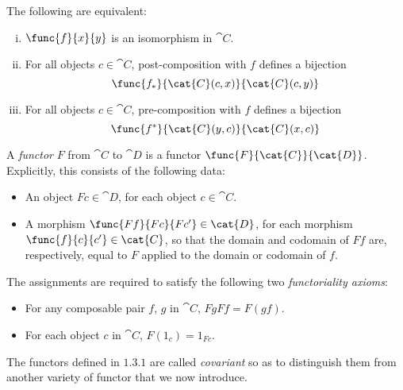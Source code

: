 \documentclass[main.tex]{subfiles}
\begin{document}
\begin{lemma}
	The following are equivalent:
	\begin{enumerate}[(i)]
		\item $\func{f}{x}{y}$ is an isomorphism in $\cat{C}$.

		\item For all objects $c\in\cat{C}$, post-composition with $f$ defines a
			bijection \[\func{f_*}{\cat{C}(c,x)}{\cat{C}(c,y)}\]

		\item For all objects $c\in\cat{C}$, pre-composition with $f$ defines a
			bijection \[\func{f^*}{\cat{C}(y,c)}{\cat{C}(x,c)}\]
	\end{enumerate}
\end{lemma}

\begin{definition}
	A \emph{functor} $F$ from $\cat{C}$ to $\cat{D}$ is a functor
	$\func{F}{\cat{C}}{\cat{D}}$. Explicitly, this consists of the following
	data:
	\begin{itemize}
		\item An object $Fc\in \cat{D}$, for each object $c\in \cat{C}$.

		\item A morphism $\func{Ff}{Fc}{Fc'}\in \cat{D}$, for each morphism
			$\func{f}{c}{c'}\in \cat{C}$, so that the domain and codomain of
			$Ff$ are, respectively, equal to $F$ applied to the domain or
			codomain of $f$.
	\end{itemize}
	The assignments are required to satisfy the following two
	\emph{functoriality axioms}:
	\begin{itemize}
		\item For any composable pair $f$, $g$ in $\cat{C}$, $Fg Ff =
			F(g f)$.

		\item For each object $c$ in $\cat{C}$, $F(1_c) = 1_{Fc}$.
	\end{itemize}
\end{definition}
The functors defined in $1.3.1$ are called \emph{covariant} so as to distinguish
them from another variety of functor that we now introduce.
\end{document}
